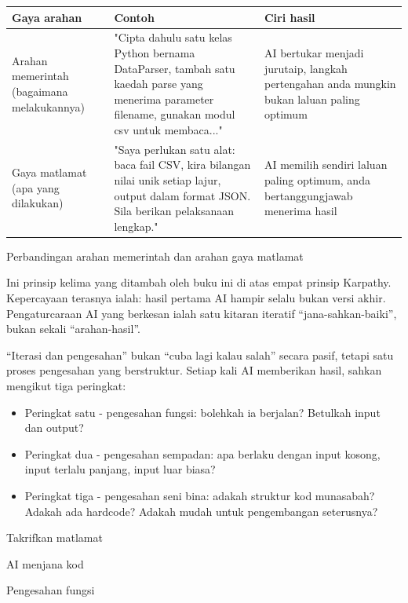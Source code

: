 \begin{center}
\begin{tabularx}{\linewidth}{|X|X|X|}
\hline
\textbf{Gaya arahan} & \textbf{Contoh} & \textbf{Ciri hasil} \tabularnewline
\hline
Arahan memerintah (bagaimana melakukannya) & "Cipta dahulu satu kelas Python bernama DataParser, tambah satu kaedah parse yang menerima parameter filename, gunakan modul csv untuk membaca..." & AI bertukar menjadi jurutaip, langkah pertengahan anda mungkin bukan laluan paling optimum \tabularnewline
Gaya matlamat (apa yang dilakukan) & "Saya perlukan satu alat: baca fail CSV, kira bilangan nilai unik setiap lajur, output dalam format JSON. Sila berikan pelaksanaan lengkap." & AI memilih sendiri laluan paling optimum, anda bertanggungjawab menerima hasil \tabularnewline
\hline
\end{tabularx}
\end{center}

\begin{center}\small\color{gray}Perbandingan arahan memerintah dan arahan gaya matlamat\end{center}


Ini prinsip kelima yang ditambah oleh buku ini di atas empat prinsip Karpathy. Kepercayaan terasnya ialah: hasil pertama AI hampir selalu bukan versi akhir. Pengaturcaraan AI yang berkesan ialah satu kitaran iteratif “jana-sahkan-baiki”, bukan sekali “arahan-hasil”.

“Iterasi dan pengesahan” bukan “cuba lagi kalau salah” secara pasif, tetapi satu proses pengesahan yang berstruktur. Setiap kali AI memberikan hasil, sahkan mengikut tiga peringkat:

\begin{itemize}
  \item Peringkat satu - pengesahan fungsi: bolehkah ia berjalan? Betulkah input dan output?
  \item Peringkat dua - pengesahan sempadan: apa berlaku dengan input kosong, input terlalu panjang, input luar biasa?
  \item Peringkat tiga - pengesahan seni bina: adakah struktur kod munasabah? Adakah ada hardcode? Adakah mudah untuk pengembangan seterusnya?
\end{itemize}

Takrifkan matlamat

AI menjana kod

Pengesahan fungsi

